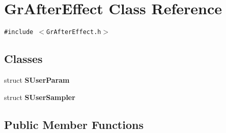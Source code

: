 \hypertarget{class_gr_after_effect}{
\section{GrAfterEffect Class Reference}
\label{class_gr_after_effect}
}
{\tt \#include $<$GrAfterEffect.h$>$}

\subsection*{Classes}
\begin{CompactItemize}
\item 
struct \textbf{SUserParam}
\item 
struct \textbf{SUserSampler}
\end{CompactItemize}
\subsection*{Public Member Functions}
